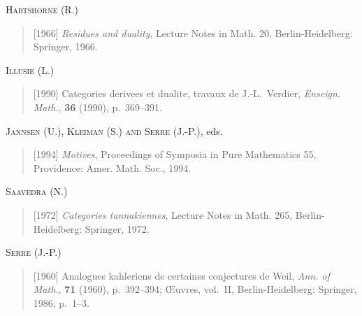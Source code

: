 \documentclass[11pt,a4paper]{article}
\theoremstyle{plain}
\theoremstyle{definition}
\begin{document}
\medskip
\noindent\textsc{Hartshorne (R.)}
\begin{quote}
[1966] \emph{Residues and duality}, Lecture Notes in Math. 20, Berlin-Heidelberg: Springer, 1966.
\end{quote}

\medskip
\noindent\textsc{Illusie (L.)}
\begin{quote}
[1990] Categories derivees et dualite, travaux de J.-L.~Verdier, \emph{Enseign. Math.}, \textbf{36} (1990), p.~369--391.
\end{quote}

\medskip
\noindent\textsc{Jannsen (U.), Kleiman (S.) and Serre (J.-P.)}, eds.
\begin{quote}
[1994] \emph{Motives}, Proceedings of Symposia in Pure Mathematics 55, Providence: Amer. Math. Soc., 1994.
\end{quote}

\medskip
\noindent\textsc{Saavedra (N.)}
\begin{quote}
[1972] \emph{Categories tannakiennes}, Lecture Notes in Math. 265, Berlin-Heidelberg: Springer, 1972.
\end{quote}

\medskip
\noindent\textsc{Serre (J.-P.)}
\begin{quote}
[1960] Analogues kahleriens de certaines conjectures de Weil, \emph{Ann. of Math.}, \textbf{71} (1960), p.~392--394; \OE uvres, vol.~II, Berlin-Heidelberg: Springer, 1986, p.~1--3.
\end{quote}
\end{document}

